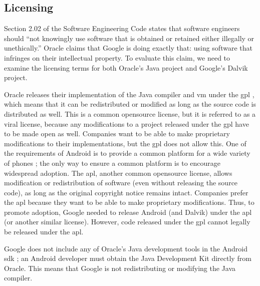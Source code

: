 \documentclass[11pt]{article}
\begin{document}
\begin{multicols}{2}


\subsection{Licensing} %
\label{sub:licensing}

Section 2.02 of the Software Engineering Code states that software engineers
should ``not knowingly use software that is obtained or retained either
illegally or unethically.'' \cite[\S2.02]{secode}  Oracle claims that Google is
doing exactly that: using software that infringes on their intellectual
property.  To evaluate this claim, we need to examine the licensing terms for
both Oracle's Java project and Google's Dalvik project.

Oracle releases their implementation of the Java compiler and \gls{vm} under the
\gls{gpl} \cite{openjdk-license}, which means that it can be redistributed or
modified as long as the source code is distributed as well.  This is a common
\gls{opensource} license, but it is referred to as a viral license, because any
modifications to a project released under the \gls{gpl} have to be made open as
well.  \cite[\S5]{gpl-license} Companies want to be able to make proprietary
modifications to their implementations, but the \gls{gpl} does not allow this.
One of the requirements of Android is to provide a common platform for a wide
variety of phones \cite{open-handset-alliance-ann}; the only way to ensure a
common platform is to encourage widespread adoption.  The \gls{apl}, another
common \gls{opensource} license, allows modification or redistribution of
software (even without releasing the source code), as long as the original
copyright notice remains intact. \cite[\S4]{apache-license} Companies prefer the
\gls{apl} because they want to be able to make proprietary modifications.
\cite{why-apache2-license} Thus, to promote adoption, Google needed to release
Android (and Dalvik) under the \gls{apl} (or another similar license).  However,
code released under the \gls{gpl} cannot legally be released under the
\gls{apl}. \cite{apache-license-gpl}

Google does not include any of Oracle's Java development tools in the Android
\gls{sdk} \cite{android-sdk-installing}; an Android developer must obtain the
Java Development Kit directly from Oracle.  This means that Google is not
redistributing or modifying the Java compiler.


\end{multicols}
\end{document}
